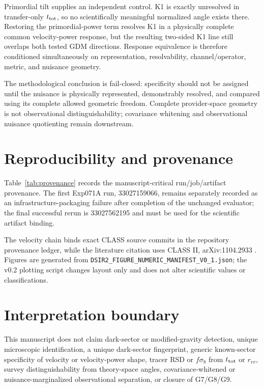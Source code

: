 \documentclass[11pt]{article}
\newcommand{\ttot}{t_{\rm tot}}
\begin{document}
Primordial tilt supplies an independent control. K1 is exactly unresolved in transfer-only $\ttot$, so no scientifically meaningful normalized angle exists there. Restoring the primordial-power term resolves K1 in a physically complete common velocity-power response, but the resulting two-sided K1 line still overlaps both tested GDM directions. Response equivalence is therefore conditioned simultaneously on representation, resolvability, channel/operator, metric, and nuisance geometry.

The methodological conclusion is fail-closed: specificity should not be assigned until the nuisance is physically represented, demonstrably resolved, and compared using its complete allowed geometric freedom. Complete provider-space geometry is not observational distinguishability; covariance whitening and observational nuisance quotienting remain downstream.

\section{Reproducibility and provenance}
Table~\ref{tab:provenance} records the manuscript-critical run/job/artifact provenance. The first Exp071A run, 33027159066, remains separately recorded as an infrastructure-packaging failure after completion of the unchanged evaluator; the final successful rerun is 33027562195 and must be used for the scientific artifact binding.

The velocity chain binds exact CLASS source commits in the repository provenance ledger, while the literature citation uses CLASS II, arXiv:1104.2933 \citep{BlasLesgourguesTram2011CLASSII}. Figures are generated from \texttt{DSIR2\_FIGURE\_NUMERIC\_MANIFEST\_V0\_1.json}; the v0.2 plotting script changes layout only and does not alter scientific values or classifications.



\section*{Interpretation boundary}
This manuscript does not claim dark-sector or modified-gravity detection, unique microscopic identification, a unique dark-sector fingerprint, generic known-sector specificity of velocity or velocity-power shape, tracer RSD or $f\sigma_8$ from $\ttot$ or $r_{vv}$, survey distinguishability from theory-space angles, covariance-whitened or nuisance-marginalized observational separation, or closure of G7/G8/G9.



\end{document}
